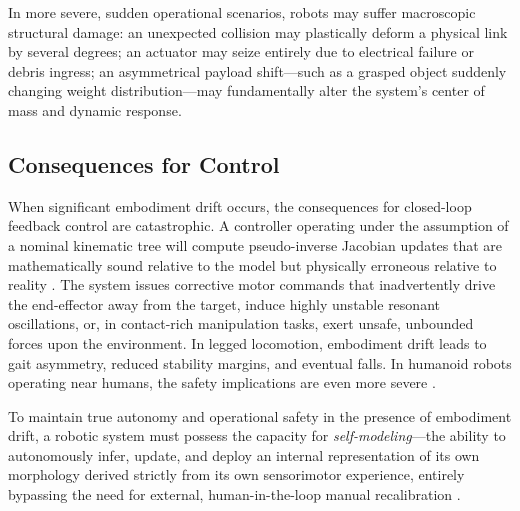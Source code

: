 \documentclass[12pt,a4paper,oneside]{report}
\begin{document}
In more severe, sudden operational scenarios, robots may suffer macroscopic structural damage: an unexpected collision may plastically deform a physical link by several degrees; an actuator may seize entirely due to electrical failure or debris ingress; an asymmetrical payload shift---such as a grasped object suddenly changing weight distribution---may fundamentally alter the system's center of mass and dynamic response.

\subsection{Consequences for Control}
\label{subsec:consequences_control}

When significant embodiment drift occurs, the consequences for closed-loop feedback control are catastrophic. A controller operating under the assumption of a nominal kinematic tree will compute pseudo-inverse Jacobian updates that are mathematically sound relative to the model but physically erroneous relative to reality \cite{siciliano2009robotics}. The system issues corrective motor commands that inadvertently drive the end-effector away from the target, induce highly unstable resonant oscillations, or, in contact-rich manipulation tasks, exert unsafe, unbounded forces upon the environment. In legged locomotion, embodiment drift leads to gait asymmetry, reduced stability margins, and eventual falls. In humanoid robots operating near humans, the safety implications are even more severe \cite{kwiatkowski2019task}.

To maintain true autonomy and operational safety in the presence of embodiment drift, a robotic system must possess the capacity for \textit{self-modeling}---the ability to autonomously infer, update, and deploy an internal representation of its own morphology derived strictly from its own sensorimotor experience, entirely bypassing the need for external, human-in-the-loop manual recalibration \cite{chen2022full, kwiatkowski2019task}.
\end{document}
